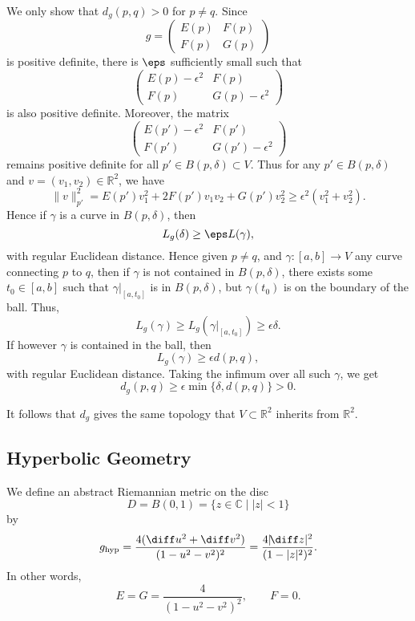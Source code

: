 \documentclass[12pt]{article}
\begin{document}
\begin{proofbox}
	We only show that $d_g(p, q) > 0$ for $p \neq q$. Since
	\[
	g =
	\begin{pmatrix}
		E(p) & F(p) \\ F(p) & G(p)
	\end{pmatrix}
	\]
	is positive definite, there is $\eps$ sufficiently small such that
	\[
	\begin{pmatrix}
		E(p) - \epsilon^2 & F(p) \\ F(p) & G(p) - \epsilon^2
	\end{pmatrix}
	\]
	is also positive definite. Moreover, the matrix
	\[
	\begin{pmatrix}
		E(p') - \epsilon^2 & F(p') \\ F(p') & G(p') - \epsilon^2
	\end{pmatrix}
	\]
	remains positive definite for all $p' \in B(p, \delta) \subset V$. Thus for any $p' \in B(p, \delta)$ and $v = (v_1, v_2) \in \mathbb{R}^2$, we have
	\[
	\|v\|_{p'}^2 = E(p')v_1^2 + 2F(p')v_1v_2 + G(p')v_2^2 \geq \epsilon^2 (v_1^2 + v_2^2).
	\]
	Hence if $\gamma$ is a curve in $B(p,\delta)$, then
	\[
	L_g(\delta) \geq \eps L(\gamma),
	\]
	with regular Euclidean distance. Hence given $p \neq q$, and $\gamma : [a, b] \to V$ any curve connecting $p$ to $q$, then if $\gamma$ is not contained in $B(p, \delta)$, there exists some $t_0 \in [a, b]$ such that $\gamma|_{[a, t_0]}$ is in $B(p, \delta)$, but $\gamma(t_0)$ is on the boundary of the ball. Thus,
	\[
		L_{g}(\gamma) \geq L_{g}(\gamma|_{[a, t_0]}) \geq \epsilon \delta.
	\]
	If however $\gamma$ is contained in the ball, then
	\[
	L_g(\gamma) \geq \epsilon d(p, q),
	\]
	with regular Euclidean distance. Taking the infimum over all such $\gamma$, we get
	\[
		d_g(p, q) \geq \epsilon \min\{\delta, d(p, q)\} > 0.
	\]
\end{proofbox}

\begin{remark}
	It follows that $d_g$ gives the same topology that $V \subset \mathbb{R}^2$ inherits from $\mathbb{R}^2$.
\end{remark}

\subsection{Hyperbolic Geometry}
\label{sub:hyperbolic_geometry}

\begin{definition}
	We define an abstract Riemannian metric on the disc
	\[
		D = B(0, 1) = \{z \in \mathbb{C} \mid |z| < 1\}
	\]
	by
	\[
		g_{\mathrm{hyp}} = \frac{4 (\diff u^2 + \diff v^2)}{(1 - u^2 - v^2)^2} = \frac{4 |\!\diff z|^2}{(1 - |z|^2)^2}.
	\]
	In other words,
	\[
	E = G = \frac{4}{(1 - u^2 - v^2)^2}, \qquad F = 0.
	\]
\end{definition}
\end{document}
